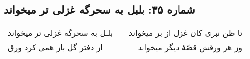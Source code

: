 \begin{center}
\section*{شماره ۳۵: بلبل به سحرگه غزلی تر میخواند}
\label{sec:035}
\begin{longtable}{l p{0.5cm} r}
بلبل به سحرگه غزلی تر میخواند
&&
تا ظن نبری کان غزل از بر میخواند
\\
از دفتر گل باز همی کرد ورق
&&
وز هر ورقش قصّهٔ دیگر میخواند
\\
\end{longtable}
\end{center}
